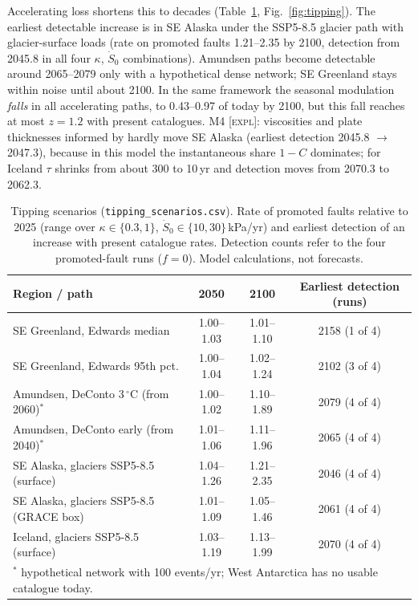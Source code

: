 \documentclass[11pt,a4paper]{article}
\newcommand{\expl}{\textnormal{\textsc{[expl]}}}
\begin{document}
Accelerating loss shortens this to decades (Table~\ref{tab:tipping}, Fig.~\ref{fig:tipping}). The earliest detectable increase is in SE Alaska under the SSP5-8.5 glacier path with glacier-surface loads (rate on promoted faults 1.21--2.35 by 2100, detection from 2045.8 in all four $\kappa$, $\dot S_0$ combinations). Amundsen paths become detectable around 2065--2079 only with a hypothetical dense network; SE Greenland stays within noise until about 2100. In the same framework the seasonal modulation \emph{falls} in all accelerating paths, to 0.43--0.97 of today by 2100, but this fall reaches at most $z=1.2$ with present catalogues. M4 \expl: viscosities and plate thicknesses informed by \textcite{sasgen2026} hardly move SE Alaska (earliest detection 2045.8 $\to$ 2047.3), because in this model the instantaneous share $1-C$ dominates; for Iceland $\tau$ shrinks from about 300 to 10\,yr and detection moves from 2070.3 to 2062.3.

\begin{table}[t]
\centering\small
\caption{Tipping scenarios (\texttt{tipping\_scenarios.csv}). Rate of promoted faults relative to 2025 (range over $\kappa\in\{0.3,1\}$, $\dot S_0\in\{10,30\}$\,kPa/yr) and earliest detection of an increase with present catalogue rates. Detection counts refer to the four promoted-fault runs ($f=0$). Model calculations, not forecasts.}
\label{tab:tipping}
\begin{tabular}{lccc}
\toprule
Region / path & 2050 & 2100 & Earliest detection (runs)\\
\midrule
SE Greenland, Edwards median & 1.00--1.03 & 1.01--1.10 & 2158 (1 of 4)\\
SE Greenland, Edwards 95th pct. & 1.00--1.04 & 1.02--1.24 & 2102 (3 of 4)\\
Amundsen, DeConto 3\,$^\circ$C (from 2060)$^\ast$ & 1.00--1.02 & 1.10--1.89 & 2079 (4 of 4)\\
Amundsen, DeConto early (from 2040)$^\ast$ & 1.01--1.06 & 1.11--1.96 & 2065 (4 of 4)\\
SE Alaska, glaciers SSP5-8.5 (surface) & 1.04--1.26 & 1.21--2.35 & 2046 (4 of 4)\\
SE Alaska, glaciers SSP5-8.5 (GRACE box) & 1.01--1.09 & 1.05--1.46 & 2061 (4 of 4)\\
Iceland, glaciers SSP5-8.5 (surface) & 1.03--1.19 & 1.13--1.99 & 2070 (4 of 4)\\
\bottomrule
\multicolumn{4}{l}{\footnotesize $^\ast$ hypothetical network with 100 events/yr; West Antarctica has no usable catalogue today.}
\end{tabular}
\end{table}
\end{document}
